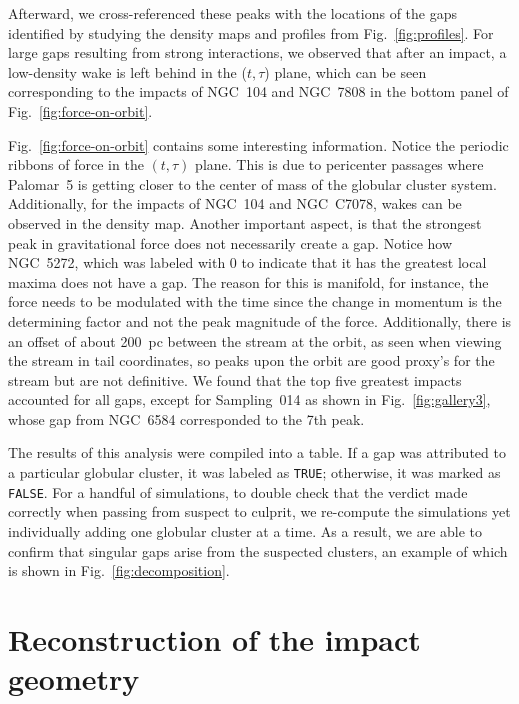 \documentclass[draft]{aa}
\begin{document}
\begin{appendix}
    Afterward, we cross-referenced these peaks with the locations of the gaps identified by studying the density maps and profiles from Fig.~\ref{fig:profiles}. For large gaps resulting from strong interactions, we observed that after an impact, a low-density wake is left behind in the ($t,\tau$) plane, which can be seen corresponding to the impacts of NGC~104 and NGC~7808 in the bottom panel of Fig.~\ref{fig:force-on-orbit}.



    Fig.~\ref{fig:force-on-orbit} contains some interesting information. Notice the periodic ribbons of force in the $(t,\tau)$ plane. This is due to pericenter passages where Palomar~5 is getting closer to the center of mass of the globular cluster system. Additionally, for the impacts of NGC~104 and NGC~C7078, wakes can be observed in the density map. Another important aspect, is that the strongest peak in gravitational force does not necessarily create a gap. Notice how NGC~5272, which was labeled with 0 to indicate that it has the greatest local maxima does not have a gap. The reason for this is manifold, for instance, the force needs to be modulated with the time since the change in momentum is the determining factor and not the peak magnitude of the force.  Additionally, there is an offset of about 200~pc between the stream at the orbit, as seen when viewing the stream in tail coordinates, so peaks upon the orbit are good proxy's for the stream but are not definitive. We found that the top five greatest impacts accounted for all gaps, except for Sampling~014 as shown in Fig.~\ref{fig:gallery3}, whose gap from NGC~6584 corresponded to the 7th peak. 

    The results of this analysis were compiled into a table. If a gap was attributed to a particular globular cluster, it was labeled as \texttt{TRUE}; otherwise, it was marked as \texttt{FALSE}. For a handful of simulations, to double check that the verdict made correctly when passing from suspect to culprit, we re-compute the simulations yet individually adding one globular cluster at a time. As a result, we are able to confirm that singular gaps arise from the suspected clusters, an example of which is shown in Fig.~\ref{fig:decomposition}. 



    \section{Reconstruction of the impact geometry} \label{sec:reconstruction}


\end{appendix}
\end{document}
